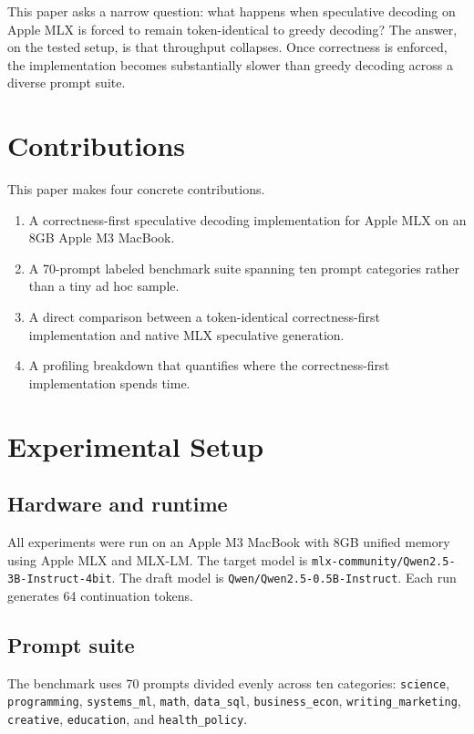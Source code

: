 \documentclass[11pt]{article}
\begin{document}
This paper asks a narrow question: what happens when speculative decoding on Apple MLX is forced to remain token-identical to greedy decoding? The answer, on the tested setup, is that throughput collapses. Once correctness is enforced, the implementation becomes substantially slower than greedy decoding across a diverse prompt suite.

\section{Contributions}

This paper makes four concrete contributions.
\begin{enumerate}
    \item A correctness-first speculative decoding implementation for Apple MLX on an 8GB Apple M3 MacBook.
    \item A 70-prompt labeled benchmark suite spanning ten prompt categories rather than a tiny ad hoc sample.
    \item A direct comparison between a token-identical correctness-first implementation and native MLX speculative generation.
    \item A profiling breakdown that quantifies where the correctness-first implementation spends time.
\end{enumerate}

\section{Experimental Setup}

\subsection{Hardware and runtime}
All experiments were run on an Apple M3 MacBook with 8GB unified memory using Apple MLX and MLX-LM. The target model is \texttt{mlx-community/Qwen2.5-3B-Instruct-4bit}. The draft model is \texttt{Qwen/Qwen2.5-0.5B-Instruct}. Each run generates 64 continuation tokens.

\subsection{Prompt suite}
The benchmark uses 70 prompts divided evenly across ten categories:
\texttt{science},
\texttt{programming},
\texttt{systems\_ml},
\texttt{math},
\texttt{data\_sql},
\texttt{business\_econ},
\texttt{writing\_marketing},
\texttt{creative},
\texttt{education}, and
\texttt{health\_policy}.
\end{document}
